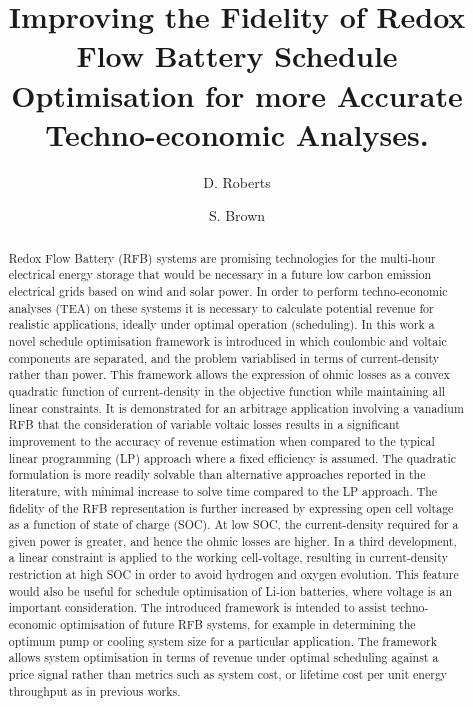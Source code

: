 \documentclass[preprint,3p,review,authoryear,10pt]{elsarticle}
\begin{document}
\linenumbers
\begin{frontmatter}

\title{Improving the Fidelity of Redox Flow Battery Schedule Optimisation for more Accurate Techno-economic Analyses.}


\author{D. Roberts }
\author[]{S. Brown }

\address{Department of Chemical and Biological Engineering, The University of Sheffield, Sheffield S10 2TN}



\begin{abstract}
Redox Flow Battery (RFB) systems are promising technologies for the multi-hour electrical energy storage that would be necessary in a future low carbon emission  electrical grids based on wind and solar power. In order to perform techno-economic analyses (TEA) on these systems it is necessary to calculate potential revenue for realistic applications, ideally under optimal operation (scheduling). In this work a novel schedule optimisation framework is introduced in which coulombic and voltaic components are separated, and the problem variablised in terms of current-density rather than power. This framework allows the expression of ohmic losses as a convex quadratic function of current-density in the objective function while maintaining all linear constraints. It is demonstrated for an arbitrage application involving a vanadium RFB that the consideration of variable voltaic losses results in a significant improvement to the accuracy of revenue estimation when compared to the typical linear programming (LP) approach where a fixed efficiency is assumed. The quadratic formulation is more readily solvable than alternative approaches reported in the literature, with minimal increase to solve time compared to the LP approach. The fidelity of the RFB representation is further increased by expressing open cell voltage as a function of state of charge (SOC). At low SOC, the current-density required for a given power is greater, and hence the ohmic losses are higher. In a third development, a linear constraint is applied to the working cell-voltage, resulting in current-density restriction at high SOC in order to avoid hydrogen and oxygen evolution. This feature would also be useful for schedule optimisation of Li-ion batteries, where voltage is an important consideration. The introduced framework is intended to assist techno-economic optimisation of future RFB systems, for example in determining the optimum pump or cooling system size for a particular application. The framework allows system optimisation in terms of revenue under optimal scheduling against a price signal rather than metrics such as system cost, or lifetime cost per unit energy throughput as in previous works.


\end{abstract}
\end{frontmatter}
\end{document}
